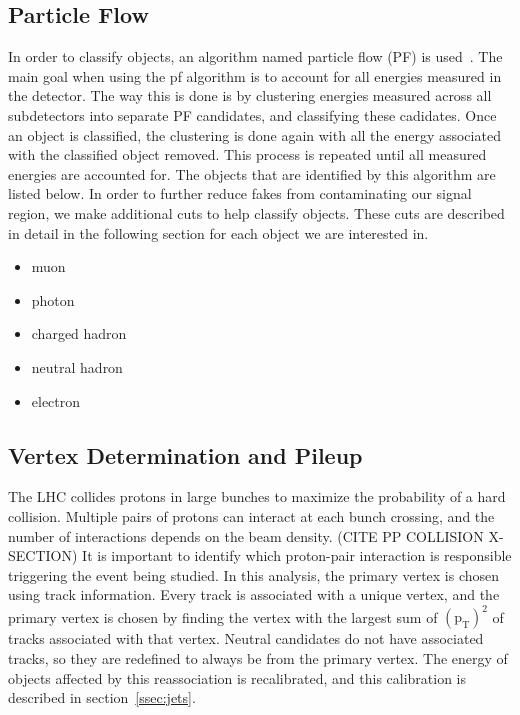 \subsection{Particle Flow}
\label{subs:particleflow}
In order to classify objects, an algorithm named particle flow (PF) is used~\cite{pfReco}. 
The main goal when using the pf algorithm is to account for all energies measured in the detector.
The way this is done is by clustering energies measured across all subdetectors into separate PF candidates, and classifying these cadidates.
Once an object is classified, the clustering is done again with all the energy associated with the classified object removed.
This process is repeated until all measured energies are accounted for.
The objects that are identified by this algorithm are listed below.
In order to further reduce fakes from contaminating our signal region, we make additional cuts to help classify objects.
These cuts are described in detail in the following section for each object we are interested in.

\begin{itemize}
\item muon          
\item photon        
\item charged hadron
\item neutral hadron
\item electron      
\end{itemize}

\subsection{Vertex Determination and Pileup}
\label{ssec:vtxandpileup}
The LHC collides protons in large bunches to maximize the probability of a hard collision.
Multiple pairs of protons can interact at each bunch crossing, and the number of interactions depends on the beam density. (CITE PP COLLISION X-SECTION)
It is important to identify which proton-pair interaction is responsible triggering the event being studied.
In this analysis, the primary vertex is chosen using track information.
Every track is associated with a unique vertex,
and the primary vertex is chosen by finding the vertex with the largest sum of $\mathrm{(p_{T})^{2}}$ of tracks associated with that vertex.
Neutral candidates do not have associated tracks, so they are redefined to always be from the primary vertex.
The energy of objects affected by this reassociation is recalibrated, and this calibration is described in section~\ref{ssec:jets}.

